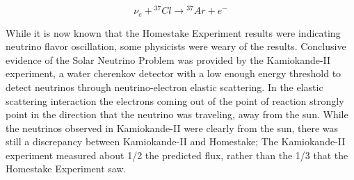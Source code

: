 \begin{equation}
\label{eq:capture}
\nu_{e} +{}^{37}Cl \rightarrow {}^{37}Ar + e^{-}
\end{equation}

While it is now known that the Homestake Experiment results were indicating neutrino flavor oscillation, some physicists were weary of the results. Conclusive evidence of the Solar Neutrino Problem was provided by the Kamiokande-II experiment, a water cherenkov detector with a low enough energy threshold to detect neutrinos through neutrino-electron elastic scattering. In the elastic scattering interaction the electrons coming out of the point of reaction strongly point in the direction that the neutrino was traveling, away from the sun. While the neutrinos observed in Kamiokande-II were clearly from the sun, there was still a discrepancy between Kamiokande-II and Homestake; The Kamiokande-II experiment measured about 1/2 the predicted flux, rather than the 1/3 that the Homestake Experiment saw.

